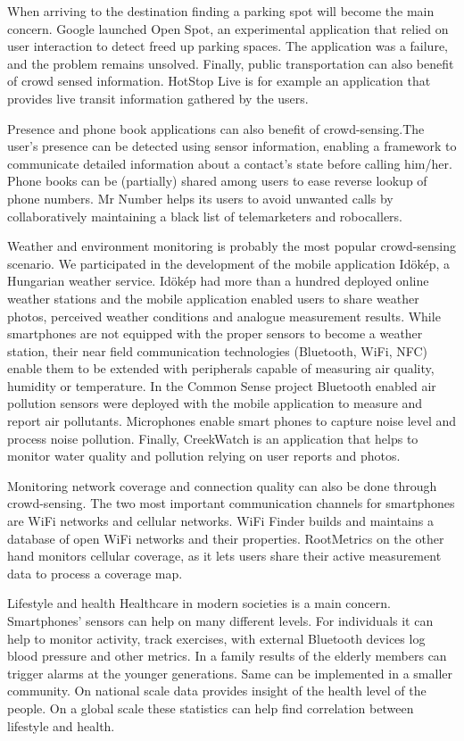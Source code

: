 \documentclass[conference,letterpaper]{IEEEtran}
\begin{document}
When arriving to the destination finding a parking spot will become the main concern. Google launched Open Spot, an experimental application that relied on user interaction to detect freed up parking spaces. The application was a failure, and the problem remains unsolved. Finally, public transportation can also benefit of crowd sensed information. HotStop Live is for example an application that provides live transit information gathered by the users.

Presence and phone book applications can also benefit of crowd-sensing.The user's presence can be detected using sensor information, enabling a framework to communicate detailed information about a contact's state before calling him/her. Phone books can be (partially) shared among users to ease reverse lookup of phone numbers. Mr Number helps its users to avoid unwanted calls by collaboratively maintaining a black list of telemarketers and robocallers.

Weather and environment monitoring is probably the most popular crowd-sensing scenario. We participated in the development of the mobile application  Id\"ok\'ep, a Hungarian weather service. Id\"ok\'ep had more than a hundred deployed online weather stations and the mobile application enabled users to share weather photos, perceived weather conditions and analogue measurement results.
While smartphones are not equipped with the proper sensors to become a weather station, their near field communication technologies (Bluetooth, WiFi, NFC) enable them to be extended with peripherals capable of measuring air quality, humidity or temperature. In the Common Sense project Bluetooth enabled air pollution sensors were deployed with the mobile application to measure and report air pollutants. Microphones enable smart phones to capture noise level and process noise pollution.
Finally, CreekWatch is an application that helps to monitor water quality and pollution relying on user reports and photos.

Monitoring network coverage and connection quality can also be done through crowd-sensing. The two most important communication channels for smartphones are WiFi networks and cellular networks. WiFi Finder builds and maintains a database of open WiFi networks and their properties. RootMetrics on the other hand monitors cellular coverage, as it lets users share their active measurement data to process a coverage map.

Lifestyle and health
Healthcare in modern societies is a main concern. Smartphones' sensors can help on many different levels. For individuals it can help to monitor activity, track exercises, with external Bluetooth devices log blood pressure and other metrics. In a family results of the elderly members can trigger alarms at the younger generations. Same can be implemented in a smaller community. On national scale data provides insight of the health level of the people. On a global scale these statistics can help find correlation between lifestyle and health.
\end{document}
